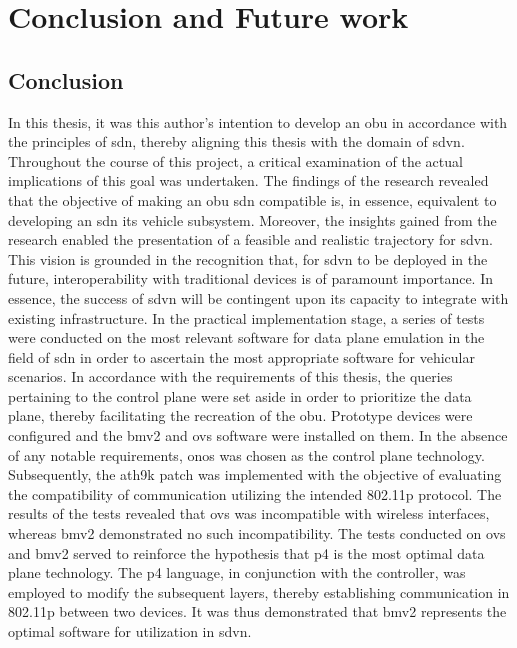 \chapter{Conclusion and Future work}
\label{cha:conclusion}

\section{Conclusion}
In this thesis, it was this author's intention to develop an \gls{obu} in accordance with the principles of \gls{sdn}, thereby aligning this thesis with the domain of \gls{sdvn}. Throughout the course of this project, a critical examination of the actual implications of this goal was undertaken. The findings of the research revealed that the objective of making an \gls{obu} \gls{sdn} compatible is, in essence, equivalent to developing an \gls{sdn} \gls{its} vehicle subsystem. Moreover, the insights gained from the research enabled the presentation of a feasible and realistic trajectory for \gls{sdvn}. This vision is grounded in the recognition that, for \gls{sdvn} to be deployed in the future, interoperability with traditional devices is of paramount importance. In essence, the success of \gls{sdvn} will be contingent upon its capacity to integrate with existing infrastructure.
In the practical implementation stage, a series of tests were conducted on the most relevant software for data plane emulation in the field of \gls{sdn} in order to ascertain the most appropriate software for vehicular scenarios. In accordance with the requirements of this thesis, the queries pertaining to the control plane were set aside in order to prioritize the data plane, thereby facilitating the recreation of the \gls{obu}. 
Prototype devices were configured and the \gls{bmv2} and \gls{ovs} software were installed on them. In the absence of any notable requirements, \gls{onos} was chosen as the control plane technology. Subsequently, the ath9k patch was implemented with the objective of evaluating the compatibility of communication utilizing the intended 802.11p protocol. The results of the tests revealed that \gls{ovs} was incompatible with wireless interfaces, whereas \gls{bmv2} demonstrated no such incompatibility.
The tests conducted on \gls{ovs} and \gls{bmv2} served to reinforce the hypothesis that \gls{p4} is the most optimal data plane technology. The \gls{p4} language, in conjunction with the controller, was employed to modify the subsequent layers, thereby establishing communication in 802.11p between two devices. It was thus demonstrated that \gls{bmv2} represents the optimal software for utilization in \gls{sdvn}. 
